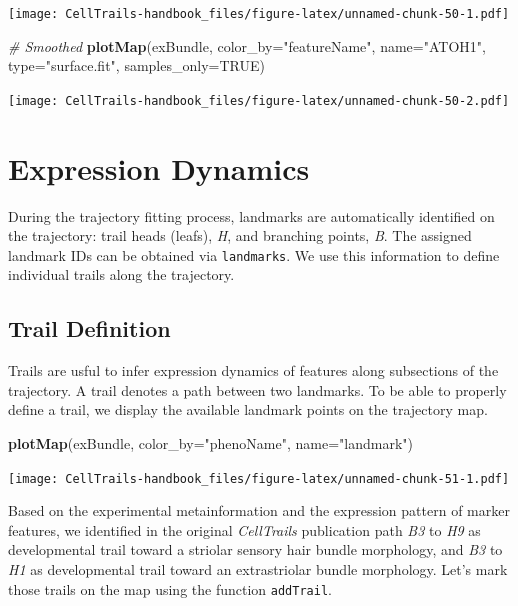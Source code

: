 \documentclass[]{book}
\newenvironment{Shaded}{\begin{snugshade}}{\end{snugshade}}
\newcommand{\KeywordTok}[1]{\textcolor[rgb]{0.13,0.29,0.53}{\textbf{#1}}}
\newcommand{\DataTypeTok}[1]{\textcolor[rgb]{0.13,0.29,0.53}{#1}}
\newcommand{\StringTok}[1]{\textcolor[rgb]{0.31,0.60,0.02}{#1}}
\newcommand{\CommentTok}[1]{\textcolor[rgb]{0.56,0.35,0.01}{\textit{#1}}}
\newcommand{\OtherTok}[1]{\textcolor[rgb]{0.56,0.35,0.01}{#1}}
\newcommand{\NormalTok}[1]{#1}
\theoremstyle{definition}
\theoremstyle{definition}
\theoremstyle{definition}
\theoremstyle{remark}
\begin{document}
\texttt{[image: CellTrails-handbook\_files/figure-latex/unnamed-chunk-50-1.pdf]}

\begin{Shaded}
\begin{Highlighting}[]
\CommentTok{# Smoothed}
\KeywordTok{plotMap}\NormalTok{(exBundle, }\DataTypeTok{color_by=}\StringTok{"featureName"}\NormalTok{, }\DataTypeTok{name=}\StringTok{"ATOH1"}\NormalTok{, }\DataTypeTok{type=}\StringTok{"surface.fit"}\NormalTok{, }
        \DataTypeTok{samples_only=}\OtherTok{TRUE}\NormalTok{)}
\end{Highlighting}
\end{Shaded}

\texttt{[image: CellTrails-handbook\_files/figure-latex/unnamed-chunk-50-2.pdf]}

\chapter{Expression Dynamics}\label{expression-dynamics}

During the trajectory fitting process, landmarks are automatically
identified on the trajectory: trail heads (leafs), \emph{H}, and
branching points, \emph{B}. The assigned landmark IDs can be obtained
via \texttt{landmarks}. We use this information to define individual
trails along the trajectory.

\section{Trail Definition}\label{trail-definition}

Trails are usful to infer expression dynamics of features along
subsections of the trajectory. A trail denotes a path between two
landmarks. To be able to properly define a trail, we display the
available landmark points on the trajectory map.

\begin{Shaded}
\begin{Highlighting}[]
\KeywordTok{plotMap}\NormalTok{(exBundle, }\DataTypeTok{color_by=}\StringTok{"phenoName"}\NormalTok{, }\DataTypeTok{name=}\StringTok{"landmark"}\NormalTok{)}
\end{Highlighting}
\end{Shaded}

\texttt{[image: CellTrails-handbook\_files/figure-latex/unnamed-chunk-51-1.pdf]}

Based on the experimental metainformation and the expression pattern of
marker features, we identified in the original \emph{CellTrails}
publication path \emph{B3} to \emph{H9} as developmental trail toward a
striolar sensory hair bundle morphology, and \emph{B3} to \emph{H1} as
developmental trail toward an extrastriolar bundle morphology. Let's
mark those trails on the map using the function \texttt{addTrail}.
\end{document}
